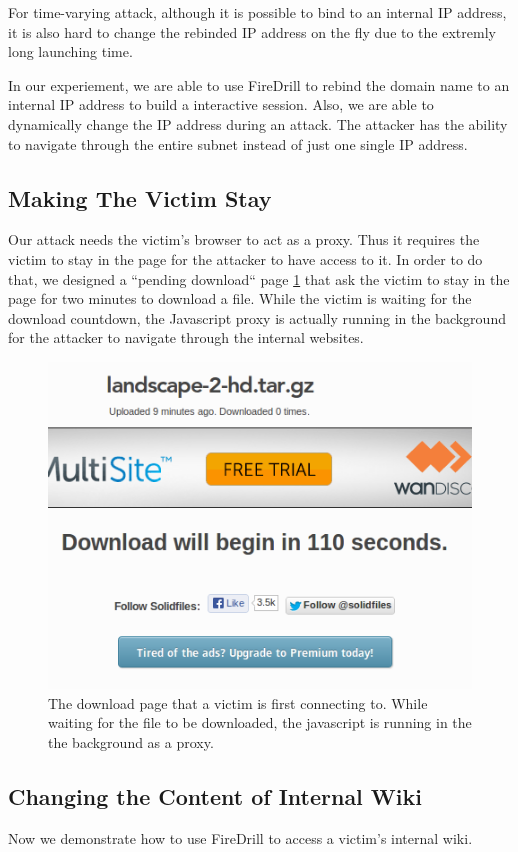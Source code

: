 For time-varying attack, although it is possible to bind to an internal IP address, it is also hard to change the rebinded IP address on the fly due to the extremly long launching time. 

In our experiement, we are able to use FireDrill to rebind the domain name to an internal IP address to build a interactive session. Also, we are able to dynamically change the IP address during an attack. The attacker has the ability to navigate through the entire subnet instead of just one single IP address.

\subsection{Making The Victim Stay}
Our attack needs the victim's browser to act as a proxy. Thus it requires the victim to stay in the page for the attacker to have access to it. In order to do that, we designed a ``pending download`` page \ref{fig:download} that ask the victim to stay in the page for two minutes to download a file. While the victim is waiting for the download countdown, the Javascript proxy is actually running in the background for the attacker to navigate through the internal websites.

\begin{figure}[h]
\centering
\includegraphics[width=0.8\columnwidth]{download.png}
\caption{The download page that a victim is first connecting to. While waiting for the file to be downloaded, the javascript is running in the the background as a proxy.}
\label{fig:download}
\end{figure}

\subsection{Changing the Content of Internal Wiki}
Now we demonstrate how to use FireDrill to access a victim's internal wiki. 

